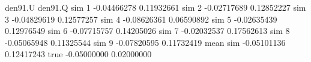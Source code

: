 \begin{Schunk}
\begin{Soutput}
             den91.U    den91.Q
sim 1    -0.04466278 0.11932661
sim 2    -0.02717689 0.12852227
sim 3    -0.04829619 0.12577257
sim 4    -0.08626361 0.06590892
sim 5    -0.02635439 0.12976549
sim 6    -0.07715757 0.14205026
sim 7    -0.02032537 0.17562613
sim 8    -0.05065948 0.11325544
sim 9    -0.07820595 0.11732419
mean sim -0.05101136 0.12417243
true     -0.05000000 0.02000000
\end{Soutput}
\end{Schunk}
